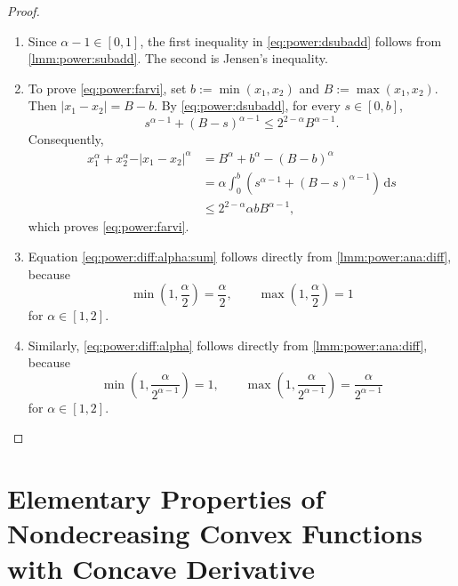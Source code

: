 \documentclass{article}
\newcommand{\lb}{\left(} %
\newcommand{\rb}{\right)} %
\newcommand{\br}[1]{\lb #1 \rb} %
\newcommand{\brOf}[1]{\!\br{#1}} %
\newcommand{\absof}[1]{\vert #1 \vert} %
\begin{document}
\begin{proof}
    \begin{enumerate}[label=(\roman*)]
        \item
        Since $\alpha-1\in[0,1]$, the first inequality in
        \eqref{eq:power:dsubadd} follows from
        \cref{lmm:power:subadd}. The second is Jensen's inequality.
        \item 
        To prove \eqref{eq:power:farvi}, set
        $b:=\min\brOf{x_1,x_2}$ and $B:=\max\brOf{x_1,x_2}$. Then
        $\absof{x_1-x_2}=B-b$. By \eqref{eq:power:dsubadd}, for every
        $s\in[0,b]$,
        \begin{equation}
            s^{\alpha-1}+(B-s)^{\alpha-1}
            \leq
            2^{2-\alpha}B^{\alpha-1}.
        \end{equation}
        Consequently,
        \begin{align}
            x_1^\alpha+x_2^\alpha-\absof{x_1-x_2}^{\alpha}
            &=
            B^\alpha+b^\alpha-(B-b)^\alpha \\
            &=
            \alpha\int_0^b
            \br{s^{\alpha-1}+(B-s)^{\alpha-1}}
            \,\mathrm{d}s \\
            &\leq
            2^{2-\alpha}\alpha bB^{\alpha-1},
        \end{align}
        which proves \eqref{eq:power:farvi}.
        \item 
        Equation \eqref{eq:power:diff:alpha:sum} follows directly from
        \cref{lmm:power:ana:diff}, because
        \begin{equation}
            \min\brOf{1,\frac{\alpha}{2}}
            =
            \frac{\alpha}{2},
            \qquad
            \max\brOf{1,\frac{\alpha}{2}}
            =
            1
        \end{equation}
        for $\alpha\in[1,2]$.
        \item 
        Similarly, \eqref{eq:power:diff:alpha} follows directly from
        \cref{lmm:power:ana:diff}, because
        \begin{equation}
            \min\brOf{1,\frac{\alpha}{2^{\alpha-1}}}
            =1,
            \qquad
            \max\brOf{1,\frac{\alpha}{2^{\alpha-1}}}
            =
            \frac{\alpha}{2^{\alpha-1}}
        \end{equation}
        for $\alpha\in[1,2]$.
    \end{enumerate}
\end{proof}
%

\section{Elementary Properties of Nondecreasing Convex Functions with Concave Derivative}\label{sec:tran}
\end{document}
